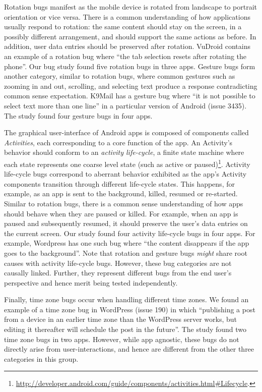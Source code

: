 Rotation bugs manifest as the mobile device is rotated from landscape to portrait orientation or vice versa. There is a common understanding of how applications usually respond to rotation: the same content should stay on the screen, in a possibly different arrangement, and should support the same actions as before. In addition, user data entries should be preserved after rotation. VuDroid contains an example of a rotation bug where ``the tab selection resets after rotating the phone''. Our bug study found five rotation bugs in three apps. Gesture bugs form another category, similar to rotation bugs, where common gestures such as zooming in and out, scrolling, and selecting text produce a response contradicting common sense expectation. K9Mail has a gesture bug where ``it is not possible to select text more than one line'' in a particular version of Android (issue 3435). The study found four gesture bugs in four apps.

The graphical user-interface of Android apps is composed of components called \textit{Activities}, each corresponding to a core function of the app. An Activity's behavior should conform to an \textit{activity life-cycle}, a finite state machine where each state represents one coarse level state (such as active or paused)\footnote{\url{http://developer.android.com/guide/components/activities.html#Lifecycle}.}. 
Activity life-cycle bugs correspond to aberrant behavior exhibited as the app's Activity components transition through different life-cycle states.
This happens, for example, as an app is sent to the background, killed, resumed or re-started. Similar to rotation bugs, there is a common sense understanding of how apps should behave when they are paused or killed. %
For example, when an app is paused and subsequently resumed, it should preserve the user's data entries on the current screen. Our study found four activity life-cycle bugs in four apps. For example, Wordpress has one such bug where ``the content disappears if the app goes to the background''. Note that rotation and gesture bugs \textit{might} share root causes with activity life-cycle bugs. However, these bug categories are not causally linked. Further, they represent different bugs from the end user's perspective and hence merit being tested independently.

Finally, time zone bugs occur when handling different time zones. We found an example of a time zone bug in WordPress (issue 190) in which ``publishing a post from a device in an earlier time zone than the WordPress server works, but editing it thereafter will schedule the post in the future''. The study found two time zone bugs in two apps. However, while app agnostic, these bugs do not directly arise from user-interactions, and hence are different from the other three categories in this group. 

